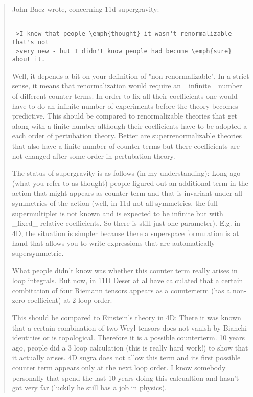 \begin{quote}
John Baez wrote, concerning 11d supergravity:


\begin{verbatim}

 >I knew that people \emph{thought} it wasn't renormalizable - that's not 
 >very new - but I didn't know people had become \emph{sure} about it.
\end{verbatim}
    

Well, it depends a bit on your definition of "non-renormalizable". In a strict
sense, it means that renormalization would require an _infinite_ number
of different counter terms. In order to fix all their coefficients
one would have to do an infinite number of experiments before the
theory becomes predictive. This should be compared to renormalizable
theories that get along with a finite number although their coefficients
have to be adopted a each order of pertubation theory. Better are
superrenormalizable theories that also have a finite number of counter
terms but there coefficients are not changed after some order in
pertubation theory. 

The status of supergravity is as follows (in my understanding): Long ago
(what you refer to as thought) people figured out an additional
term in the action that might appears as counter term and that is 
invariant under all symmetries of the action (well, in 11d not
all symmetries, the full supermultiplet is not known and is expected
to be infinite but with _fixed_ relative coefficients. So there
is still just one parameter). E.g. in 4D, the situation is simpler because
there a superspace formulation is at hand that allows you to write expressions
that are automatically supersymmetric.

What people didn't know was whether this counter term really arises in
loop integrals. But now, in 11D Deser at al have calculated that a
certain combitation of four Riemann tensors appears as a counterterm
(has a non-zero coefficient) at 2 loop order.

This should be compared to Einstein's theory in 4D: There it was known
that a certain combination of two Weyl tensors does not vanish
by Bianchi identities or is topological. Therefore it is a possible
counterterm. 10 years ago, people did a 3 loop calculation (this is
really hard work!) to show that it actually arises. 4D sugra does not 
allow this term and its first possible counter term appears only at the 
next loop order. I know somebody personally that spend the last 10 years
doing this calcualtion and hasn't got very far (luckily he still has a 
job in physics).


\end{quote}
